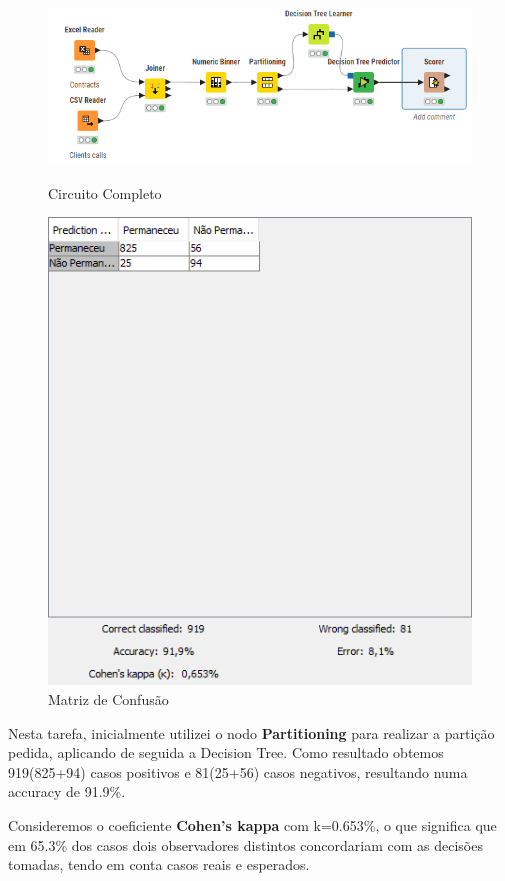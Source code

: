 \documentclass[a4paper, 12pt]{article}
\begin{document}
\begin{figure}[htp]
    
    \centering
     \includegraphics[scale=1]{T3/Circuito.png}
     \caption{Circuito Completo}
    \vspace{0.5cm}
     \centering
     \includegraphics[scale=0.5]{T3/ConfusionMatrix.png}
     \caption{Matriz de Confusão}
\end{figure} 

Nesta tarefa, inicialmente utilizei o nodo \textbf{Partitioning} para realizar a partição pedida, aplicando de seguida a Decision Tree. Como resultado obtemos 919(825+94) casos positivos e 81(25+56) casos negativos, resultando numa accuracy de 91.9\%. 

Consideremos o coeficiente \textbf{Cohen's kappa} com k=0.653\%, o que significa que em 65.3\% dos casos dois observadores distintos concordariam com as decisões tomadas, tendo em conta casos reais e esperados. 
\end{document}
